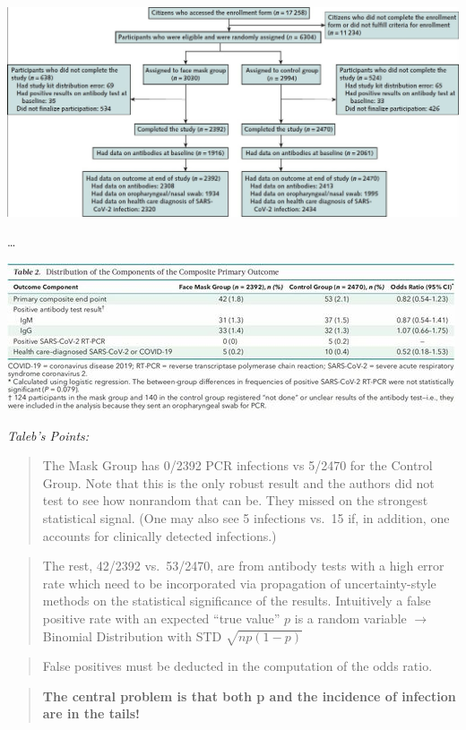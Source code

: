 \documentclass[
]{book}
\begin{document}
\includegraphics{fig/Bundgaard_Study_Flow.jpg}

\ldots{}

\includegraphics{fig/Bundgaard_Outcome_Components.jpg}

\emph{Taleb's Points:}

\begin{quote}
The Mask Group has 0/2392 PCR infections vs 5/2470 for the Control Group. Note that this is the only robust result and the authors did not test to see how nonrandom that can be. They missed on the strongest statistical signal. (One may also see 5 infections vs.~15 if, in addition, one accounts for clinically detected infections.)
\end{quote}

\begin{quote}
The rest, 42/2392 vs.~53/2470, are from antibody tests with a high error rate
which need to be incorporated via propagation of uncertainty-style methods
on the statistical significance of the results.
Intuitively a false positive rate with an expected ``true value'' \(p\)
is a random variable \(\rightarrow\) Binomial Distribution with STD \(\sqrt{n p (1-p)}\)
\end{quote}

\begin{quote}
False positives must be deducted in the computation of the odds ratio.
\end{quote}

\begin{quote}
\textbf{The central problem is that both p and the incidence of infection are in the tails!}
\end{quote}
\end{document}
